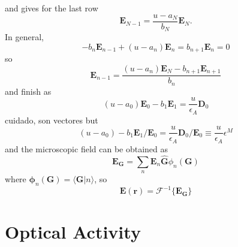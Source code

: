 \documentclass[preprint,12pt]{revtex4}
\begin{document}
and gives for the last row
\begin{equation}
 \mathbf E_{N-1}=\frac{u-a_N}{b_N}\mathbf E_N.
\end{equation}
In general,
\begin{equation}
-b_n \mathbf E_{n-1} +(u-a_n)\mathbf E_n=b_{n+1}\mathbf E_n=0
\end{equation}
so
\begin{equation}
 \mathbf E_{n-1}=\frac{(u-a_n)\mathbf E_N-b_{n+1}\mathbf E_{n+1}}{b_n}
\end{equation}
and finish as
\begin{equation}
(u-a_0)\mathbf E_0 -b_{1}\mathbf E_1=\frac{u}{\epsilon_A}\mathbf D_0
\end{equation}
cuidado, son vectores
but
\begin{equation}
(u-a_0) -b_{1}\mathbf E_1/\mathbf E_0=\frac{u}{\epsilon_A}\mathbf
  D_0/\mathbf E_0\equiv \frac{u}{\epsilon_A}\epsilon^M
\end{equation}
and the microscopic field can be obtained as
\begin{equation}
\mathbf E_{\mathbf G}=\sum_n \mathbf E_n \hat {\mathbf G }
\phi_n(\mathbf G)
\end{equation}
where $\mathbf \phi_n(\mathbf G)=\langle\mathbf{ G}|n \rangle$, so
\begin{equation}
\mathbf E (\mathbf r)=\mathscr{F}^{-1}\{\mathbf E_{\mathbf G} \}
\end{equation}

\section{Optical Activity}
\end{document}

